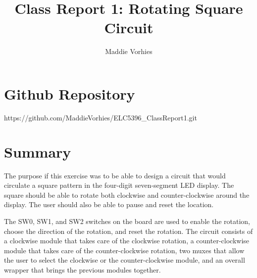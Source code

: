 \documentclass[11pt]{article}
\begin{document}
\title{Class Report 1: Rotating Square Circuit}
\author{Maddie Vorhies}

\maketitle

\section*{Github Repository}
https://github.com/MaddieVorhies/ELC5396\_ClassReport1.git

\section*{Summary}

The purpose if this exercise was to be able to design a circuit that would circulate a square pattern in the four-digit seven-segment LED display. The square should be able to rotate both clockwise and counter-clockwise around the display. The user should also be able to pause and reset the location.\newline

The SW0, SW1, and SW2 switches on the board are used to enable the rotation, choose the direction of the rotation, and reset the rotation. The circuit consists of a clockwise module that takes care of the clockwise rotation, a counter-clockwise module that takes care of the counter-clockwise rotation, two muxes that allow the user to select the clockwise or the counter-clockwise module, and an overall wrapper that brings the previous modules together. \newline\newline\newline\newline\newline\newline\newline\newline\newline\newline\newline\newline\newline\newline\newline\newline\newline\newline\newline
\end{document}
